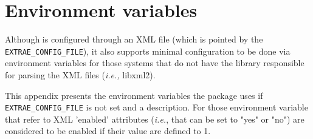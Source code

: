 \chapter{Environment variables}\label{cha:EnvVar}

Although \TRACE is configured through an XML file (which is pointed by the {\tt EXTRAE\_CONFIG\_FILE}), it also supports minimal configuration to be done via environment variables for those systems that do not have the library responsible for parsing the XML files ({\em i.e.,} libxml2).

This appendix presents the environment variables the \TRACE package uses if {\tt EXTRAE\_CONFIG\_FILE} is not set and a description. For those environment variable that refer to XML 'enabled' attributes ({\em i.e.}, that can be set to "yes" or "no") are considered to be enabled if their value are defined to 1.
 
